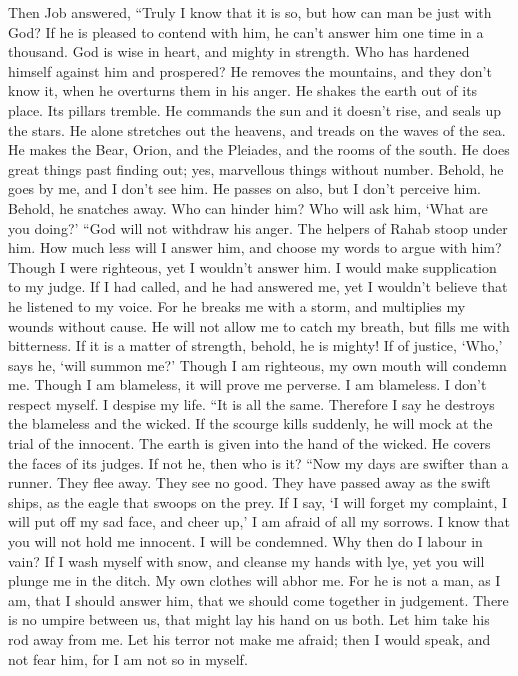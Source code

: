  Then Job answered,  ``Truly I know that it
is so, but how can man be just with God?  If he is pleased
to contend with him, he can't answer him one time in a thousand.
 God is wise in heart, and mighty in strength. Who has
hardened himself against him and prospered?  He removes
the mountains, and they don't know it, when he overturns them in his
anger.  He shakes the earth out of its place. Its pillars
tremble.  He commands the sun and it doesn't rise, and
seals up the stars.  He alone stretches out the heavens,
and treads on the waves of the sea.  He makes the Bear,
Orion, and the Pleiades, and the rooms of the south.  He
does great things past finding out; yes, marvellous things without
number.  Behold, he goes by me, and I don't see him. He
passes on also, but I don't perceive him.  Behold, he
snatches away. Who can hinder him? Who will ask him, `What are you
doing?'  ``God will not withdraw his anger. The helpers
of Rahab stoop under him.  How much less will I answer
him, and choose my words to argue with him?  Though I
were righteous, yet I wouldn't answer him. I would make supplication to
my judge.  If I had called, and he had answered me, yet I
wouldn't believe that he listened to my voice.  For he
breaks me with a storm, and multiplies my wounds without cause.
 He will not allow me to catch my breath, but fills me
with bitterness.  If it is a matter of strength, behold,
he is mighty! If of justice, `Who,' says he, `will summon me?'
 Though I am righteous, my own mouth will condemn me.
Though I am blameless, it will prove me perverse.  I am
blameless. I don't respect myself. I despise my life. 
``It is all the same. Therefore I say he destroys the blameless and the
wicked.  If the scourge kills suddenly, he will mock at
the trial of the innocent.  The earth is given into the
hand of the wicked. He covers the faces of its judges. If not he, then
who is it?  ``Now my days are swifter than a runner. They
flee away. They see no good.  They have passed away as
the swift ships, as the eagle that swoops on the prey. 
If I say, `I will forget my complaint, I will put off my sad face, and
cheer up,'  I am afraid of all my sorrows. I know that
you will not hold me innocent.  I will be condemned. Why
then do I labour in vain?  If I wash myself with snow,
and cleanse my hands with lye,  yet you will plunge me in
the ditch. My own clothes will abhor me.  For he is not a
man, as I am, that I should answer him, that we should come together in
judgement.  There is no umpire between us, that might lay
his hand on us both.  Let him take his rod away from me.
Let his terror not make me afraid;  then I would speak,
and not fear him, for I am not so in myself.

